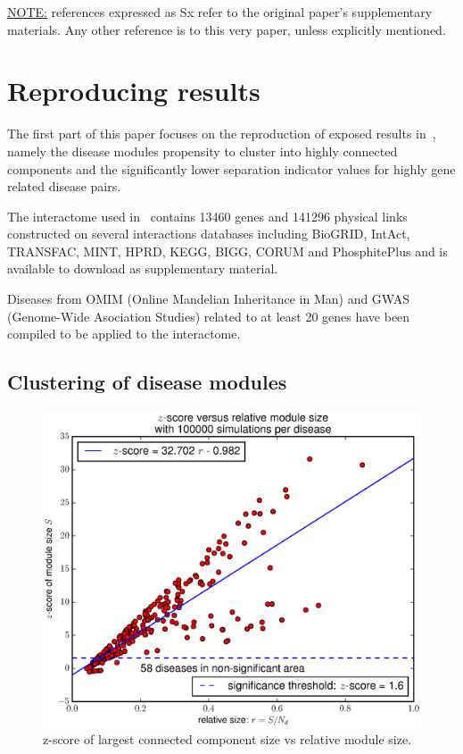 \documentclass[letterpaper]{article}
\begin{document}
\underline{NOTE:} references expressed as Sx refer to the original paper's supplementary materials. Any
other reference is to this very paper, unless explicitly mentioned.

\section{Reproducing results}
The first part of this paper focuses on the reproduction of exposed results in~\cite{originalPaper},
namely the disease modules propensity to cluster into highly connected components and the significantly
lower separation indicator values for highly gene related disease pairs.

The interactome used in~\cite{originalPaper} contains 13460 genes and 141296 physical links constructed on several
interactions databases including BioGRID, IntAct, TRANSFAC, MINT, HPRD, KEGG, BIGG, CORUM and PhosphitePlus and
is available to download as supplementary material.

Diseases from OMIM (Online Mandelian Inheritance in Man) and GWAS (Genome-Wide Asociation Studies)
related to at least 20 genes have been compiled to be applied to the interactome.

	\subsection{Clustering of disease modules}\label{subsec:clustering of disease modules}

	\begin{figure}[!h]
		\includegraphics[width=.5\textwidth]{images/S4.b100000.eps}
		\caption{z-score of largest connected component size vs relative module size.\label{fig:zscore}}
	\end{figure}
\end{document}
